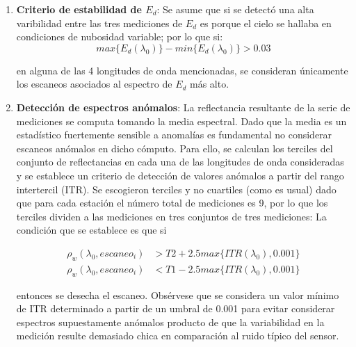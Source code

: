             \begin{enumerate}
                \item \textbf{Criterio de estabilidad de $E_{d}$}: Se asume que si se detectó una alta varibilidad entre las tres mediciones de $E_{d}$ es porque el cielo se hallaba en condiciones de nubosidad variable; por lo que si:
                \begin{equation}
                    max\{E_{d}(\lambda_{0})\} - min\{E_{d}(\lambda_{0})\} > 0.03
                \end{equation}
                
                \noindent
                en alguna de las 4 longitudes de onda mencionadas, se consideran únicamente los escaneos asociados al espectro de $E_{d}$ más alto.

                \item \textbf{Detección de espectros anómalos}: La reflectancia resultante de la serie de mediciones se computa tomando la media espectral. Dado que la media es un estadístico fuertemente sensible a anomalías es fundamental no considerar escaneos anómalos en dicho cómputo. Para ello, se calculan los terciles del conjunto de reflectancias en cada una de las longitudes de onda consideradas y se establece un criterio de detección de valores anómalos a partir del rango intertercil (ITR). Se escogieron terciles y no cuartiles (como es usual) dado que para cada estación el número total de mediciones es 9, por lo que los terciles dividen a las mediciones en tres conjuntos de tres mediciones: La condición que se establece es que si
                
                \begin{equation}
                \begin{aligned}
                \rho_{w}(\lambda_{0},escaneo_{i}) &> T2 + 2.5max\{ITR(\lambda_{0}),0.001\}\\
                \rho_{w}(\lambda_{0},escaneo_{i}) &< T1 - 2.5max\{ITR(\lambda_{0}),0.001\}
                \end{aligned}    
                \label{dat:eq:ITR}
                \end{equation}
                
                \noindent
                entonces se desecha el escaneo. Obsérvese que se considera un valor mínimo de ITR determinado a partir de un umbral de 0.001 para evitar considerar espectros supuestamente anómalos producto de que la variabilidad en la medición resulte demasiado chica en comparación al ruido típico del sensor.


\end{enumerate}
